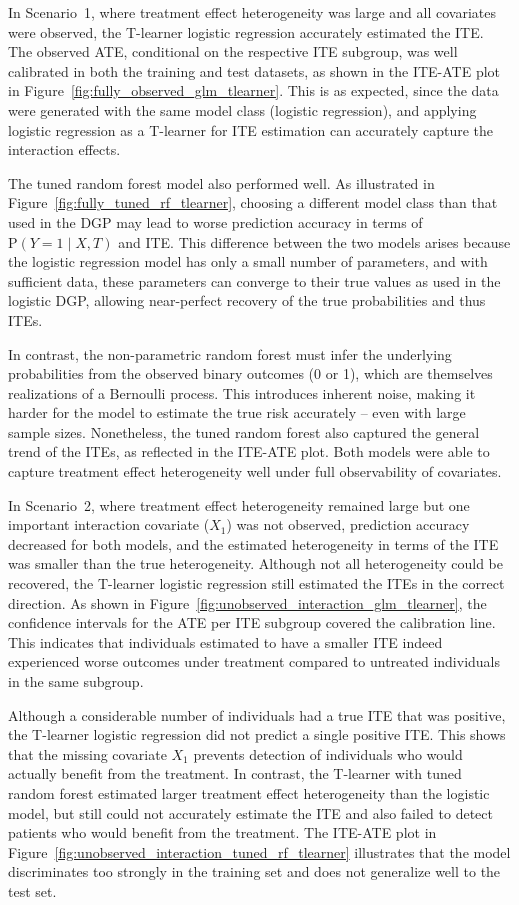 In Scenario~1, where treatment effect heterogeneity was large and all covariates were observed, the T-learner logistic regression accurately estimated the ITE. The observed ATE, conditional on the respective ITE subgroup, was well calibrated in both the training and test datasets, as shown in the ITE-ATE plot in Figure~\ref{fig:fully_observed_glm_tlearner}. This is as expected, since the data were generated with the same model class (logistic regression), and applying logistic regression as a T-learner for ITE estimation can accurately capture the interaction effects.

The tuned random forest model also performed well. As illustrated in Figure~\ref{fig:fully_tuned_rf_tlearner}, choosing a different model class than that used in the DGP may lead to worse prediction accuracy in terms of $\text{P}(Y = 1 \mid X, T)$ and ITE. This difference between the two models arises because the logistic regression model has only a small number of parameters, and with sufficient data, these parameters can converge to their true values as used in the logistic DGP, allowing near-perfect recovery of the true probabilities and thus ITEs. 

In contrast, the non-parametric random forest must infer the underlying probabilities from the observed binary outcomes (0 or 1), which are themselves realizations of a Bernoulli process. This introduces inherent noise, making it harder for the model to estimate the true risk accurately -- even with large sample sizes. Nonetheless, the tuned random forest also captured the general trend of the ITEs, as reflected in the ITE-ATE plot. Both models were able to capture treatment effect heterogeneity well under full observability of covariates.


In Scenario~2, where treatment effect heterogeneity remained large but one important interaction covariate ($X_1$) was not observed, prediction accuracy decreased for both models, and the estimated heterogeneity in terms of the ITE was smaller than the true heterogeneity. Although not all heterogeneity could be recovered, the T-learner logistic regression still estimated the ITEs in the correct direction. As shown in Figure~\ref{fig:unobserved_interaction_glm_tlearner}, the confidence intervals for the ATE per ITE subgroup covered the calibration line. This indicates that individuals estimated to have a smaller ITE indeed experienced worse outcomes under treatment compared to untreated individuals in the same subgroup.

Although a considerable number of individuals had a true ITE that was positive, the T-learner logistic regression did not predict a single positive ITE. This shows that the missing covariate $X_1$ prevents detection of individuals who would actually benefit from the treatment. In contrast, the T-learner with tuned random forest estimated larger treatment effect heterogeneity than the logistic model, but still could not accurately estimate the ITE and also failed to detect patients who would benefit from the treatment. The ITE-ATE plot in Figure~\ref{fig:unobserved_interaction_tuned_rf_tlearner} illustrates that the model discriminates too strongly in the training set and does not generalize well to the test set.


